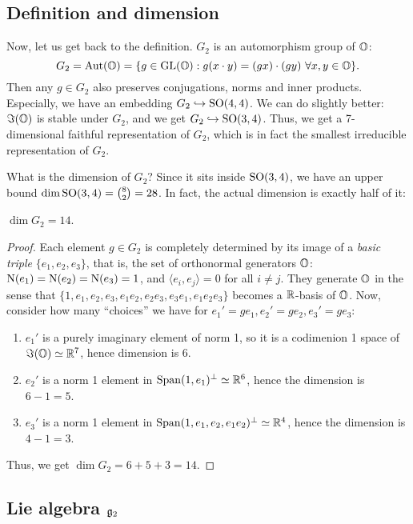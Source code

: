 \subsection{Definition and dimension}
\label{subsec:g2def}

Now, let us get back to the definition.
$G_2$ is an automorphism group of $\mathbb{O}$:
$$
G_2 = \mathrm{Aut}(\mathbb{O}) = \{g \in \mathrm{GL}(\mathbb{O}): g(x\cdot y) = (gx) \cdot (gy) \,\,\forall x, y \in \mathbb{O}\}.
$$
Then any $g \in G_2$ also preserves conjugations, norms and inner products.
Especially, we have an embedding $G_2 \hookrightarrow \mathrm{SO}(4, 4)$.
We can do slightly better: $\Im(\mathbb{O})$ is stable under $G_2$, and we get $G_2 \hookrightarrow \mathrm{SO}(3, 4)$.
Thus, we get a 7-dimensional faithful representation of $G_2$, which is in fact the smallest irreducible representation of $G_2$.

What is the dimension of $G_2$? Since it sits inside $\mathrm{SO}(3, 4)$, we have an upper bound $\dim \mathrm{SO}(3, 4) = \binom{8}{2} = 28$.
In fact, the actual dimension is exactly half of it:

\begin{proposition}
\label{prop:dim}
$\dim G_2 = 14$.
\end{proposition}

\begin{proof}
Each element $g \in G_2$ is completely determined by its image of a \emph{basic triple} $\{e_1, e_2, e_3\}$, that is, the set of orthonormal generators $\mathbb{O}$: $\mathrm{N}(e_1) = \mathrm{N}(e_2) = \mathrm{N}(e_3) = 1$, and $\langle e_i, e_j \rangle = 0$ for all $i \ne j$.
They generate $\mathbb{O}$ in the sense that $\{1, e_1, e_2, e_3, e_1 e_2, e_2 e_3, e_3 e_1, e_1 e_2 e_3\}$ becomes a $\mathbb{R}$-basis of $\mathbb{O}$.
Now, consider how many ``choices'' we have for $e_1' = ge_1, e_2' = ge_2, e_3' = ge_3$:
\begin{enumerate}
    \item $e_1'$ is a purely imaginary element of norm 1, so it is a codimenion 1 space of $\Im(\mathbb{O}) \simeq \mathbb{R}^7$, hence dimension is 6.
    \item $e_2'$ is a norm 1 element in $\mathrm{Span}(1, e_1)^\perp \simeq \mathbb{R}^6$, hence the dimension is $6 -1 = 5$.
    \item $e_3'$ is a norm 1 element in $\mathrm{Span} (1, e_1, e_2, e_1 e_2)^\perp \simeq \mathbb{R}^4$, hence the dimension is $4 - 1 = 3$.
\end{enumerate}
Thus, we get $\dim G_2 = 6 + 5 + 3 = 14$.
\end{proof}

\subsection{Lie algebra $\mathfrak{g}_2$}

